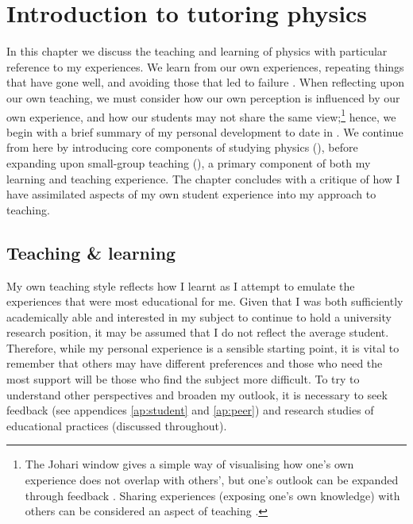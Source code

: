 \chapter{Introduction to tutoring physics}\label{ch:intro}

In this chapter we discuss the teaching and learning of physics with particular reference to my experiences. We learn from our own experiences, repeating things that have gone well, and avoiding those that led to failure \citep[chapter 2]{Skinner1954,Kolb1984}. When reflecting upon our own teaching, we must consider how our own perception is influenced by our own experience, and how our students may not share the same view;\footnote{The Johari window gives a simple way of visualising how one's own experience does not overlap with others', but one's outlook can be expanded through feedback \citep{Luft1961}. Sharing experiences (exposing one's own knowledge) with others can be considered an aspect of teaching \citep[cf.][chapter 7]{Ramsden1992}.} hence, we begin with a brief summary of my personal development to date in . We continue from here by introducing core components of studying physics (), before expanding upon small-group teaching (), a primary component of both my learning and teaching experience. %
The chapter concludes with a critique of how I have assimilated aspects of my own student experience into my approach to teaching.

\section{Teaching \& learning}\label{sec:teach-n-learn}

My own teaching style reflects how I learnt as I attempt to emulate the experiences that were most educational for me. Given that I was both sufficiently academically able and interested in my subject to continue to hold a university research position, it may be assumed that I do not reflect the average student. Therefore, while my personal experience is a sensible starting point, it is vital to remember that others may have different preferences \citep[chapter 5]{Ramsden1992} and those who need the most support will be those who find the subject more difficult. To try to understand other perspectives and broaden my outlook, it is necessary to seek feedback (see appendices \ref{ap:student} and \ref{ap:peer}) and research studies of educational practices (discussed throughout).

